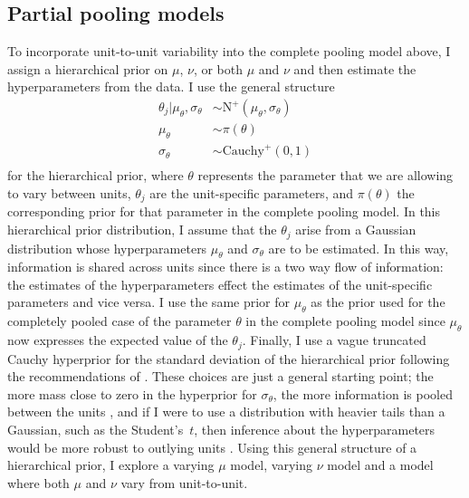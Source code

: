 \subsection{Partial pooling models} \label{subsec:partial-pooling}

To incorporate unit-to-unit variability into the complete pooling model above, I assign a hierarchical prior on $\mu$, $\nu$, or both $\mu$ and $\nu$ and then estimate the hyperparameters from the data. I use the general structure
\begin{align*}
   \theta_j| \mu_\theta, \sigma_\theta & \sim \mbox{N}^{+}(\mu_\theta, \sigma_\theta) \\
   \mu_\theta & \sim \pi(\theta)\\
   \sigma_\theta & \sim \mbox{Cauchy}^{+}(0, 1) \\
\end{align*}
for the hierarchical prior, where $\theta$ represents the parameter that we are allowing to vary between units, $\theta_j$ are the unit-specific parameters, and $\pi(\theta)$ the corresponding prior for that parameter in the complete pooling model. In this hierarchical prior distribution, I assume that the $\theta_j$ arise from a Gaussian distribution whose hyperparameters $\mu_\theta$ and $\sigma_\theta$ are to be estimated. In this way, information is shared across units since there is a two way flow of information: the estimates of the hyperparameters effect the estimates of the unit-specific parameters and vice versa. I use the same prior for $\mu_\theta$ as the prior used for the completely pooled case of the parameter $\theta$ in the complete pooling model since $\mu_\theta$ now expresses the expected value of the $\theta_j$. Finally, I use a vague truncated Cauchy hyperprior for the standard deviation of the hierarchical prior following the recommendations of \citet[chap.~17]{BDA2020}. These choices are just a general starting point; the more mass close to zero in the hyperprior for $\sigma_\theta$, the more information is pooled between the units \citep{McElreath_2020}, and if I were to use a distribution with heavier tails than a Gaussian, such as the Student's~$t$, then inference about the hyperparameters would be more robust to outlying units \citep[Chap.~17]{BDA2020}. Using this general structure of a hierarchical prior, I explore a varying $\mu$ model, varying $\nu$ model and a model where both $\mu$ and $\nu$ vary from unit-to-unit.

